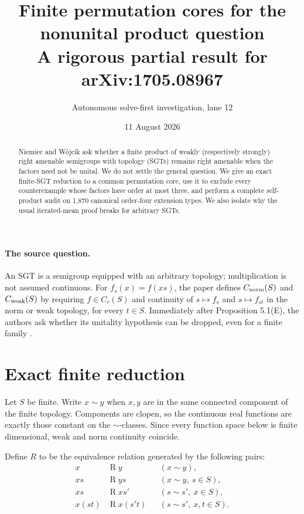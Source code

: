 \documentclass[11pt]{article}
\title{Finite permutation cores for the nonunital product question\\
\large A rigorous partial result for arXiv:1705.08967}
\author{Autonomous solve-first investigation, lane 12}
\date{11 August 2026}
\begin{document}
\maketitle

\begin{abstract}
Niemiec and W\'ojcik ask whether a finite product of weakly (respectively
strongly) right amenable semigroups with topology (SGTs) remains right
amenable when the factors need not be unital.  We do not settle the general
question.  We give an exact finite-SGT reduction to a common permutation core,
use it to exclude every counterexample whose factors have order at most three,
and perform a complete self-product audit on 1,870 canonical order-four
extension types.  We also isolate why the usual iterated-mean proof breaks for
arbitrary SGTs.
\end{abstract}

\paragraph{The source question.}
An SGT is a semigroup equipped with an arbitrary topology; multiplication is
not assumed continuous.  For $f_s(x)=f(xs)$, the paper defines
$C_{\rm norm}(S)$ and $C_{\rm weak}(S)$ by requiring $f\in C_r(S)$ and
continuity of $s\mapsto f_s$ and $s\mapsto f_{st}$ in the norm or weak
topology, for every $t\in S$.  Immediately after Proposition 5.1(E), the
authors ask whether its unitality hypothesis can be dropped, even for a finite
family \cite[p.~14]{NW}.

\section{Exact finite reduction}

Let $S$ be finite.  Write $x\sim y$ when $x,y$ are in the same connected
component of the finite topology.  Components are clopen, so the continuous
real functions are exactly those constant on the $\sim$-classes.  Since every
function space below is finite dimensional, weak and norm continuity coincide.

Define $R$ to be the equivalence relation generated by the following pairs:
\begin{align*}
x&\mathrel R y &&(x\sim y),\\
xs&\mathrel R ys &&(x\sim y,\ s\in S),\\
xs&\mathrel R xs' &&(s\sim s',\ x\in S),\\
x(st)&\mathrel R x(s't) &&(s\sim s',\ x,t\in S).
\end{align*}
\end{document}
